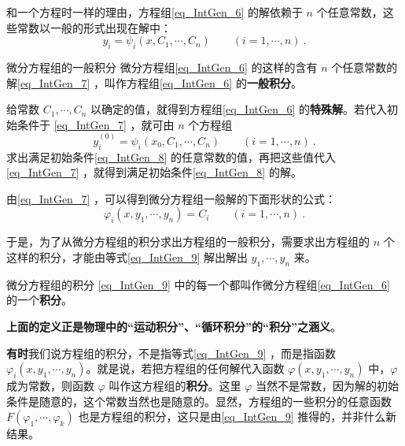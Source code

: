 和一个方程时一样的理由，方程组\autoref{eq_IntGen_6} 的解依赖于 $n$ 个任意常数，这些常数以一般的形式出现在解中：
\begin{equation}\label{eq_IntGen_7}
y_i=\psi_i(x,C_1,\cdots,C_n)\qquad (i=1,\cdots,n)~.
\end{equation}
\begin{definition}{微分方程组的一般积分}
微分方程组\autoref{eq_IntGen_6} 的这样的含有 $n$ 个任意常数的解\autoref{eq_IntGen_7} ，叫作方程组\autoref{eq_IntGen_6} 的\textbf{一般积分}。
\end{definition}
给常数 $C_1,\cdots,C_n$ 以确定的值，就得到方程组\autoref{eq_IntGen_6} 的\textbf{特殊解}。若代入初始条件于 \autoref{eq_IntGen_7} ，就可由 $n$ 个方程组
\begin{equation}
y_i^{(0)}=\psi_i(x_0,C_1,\cdots,C_n) \qquad (i=1,\cdots,n)~.
\end{equation}
求出满足初始条件\autoref{eq_IntGen_8} 的任意常数的值，再把这些值代入\autoref{eq_IntGen_7} ，就得到满足初始条件\autoref{eq_IntGen_8} 的解。

由\autoref{eq_IntGen_7} ，可以得到微分方程组一般解的下面形状的公式：
\begin{equation}\label{eq_IntGen_9}
\varphi_i(x,y_1,\cdots,y_n)=C_i\qquad (i=1,\cdots,n)~.
\end{equation}


于是，为了从微分方程组的积分求出方程组的一般积分，需要求出方程组的 $n$ 个这样的积分，才能由等式\autoref{eq_IntGen_9} 解出解出 $y_1,\cdots,y_n$ 来。
\begin{definition}{微分方程组的积分}\label{def_IntGen_1}
\autoref{eq_IntGen_9} 中的每一个都叫作微分方程组\autoref{eq_IntGen_6} 的一个\textbf{积分}。
\end{definition}
\textbf{上面的定义正是物理中的“运动积分”、“循环积分”的“积分”之涵义}。

\textbf{有时}我们说方程组的积分，不是指等式\autoref{eq_IntGen_9} ，而是指函数 $\varphi_i(x,y_1,\cdots,y_n)$。就是说，若把方程组的任何解代入函数 $\varphi(x,y_1,\cdots,y_n)$ 中，$\varphi$ 成为常数，则函数 $\varphi$ 叫作这方程组的\textbf{积分}。这里 $\varphi$ 当然不是常数，因为解的初始条件是随意的，这个常数当然也是随意的。显然，方程组的一些积分的任意函数 $F(\varphi_1,\cdots,\varphi_k)$ 也是方程组的积分，这只是由\autoref{eq_IntGen_9} 推得的，并非什么新结果。
